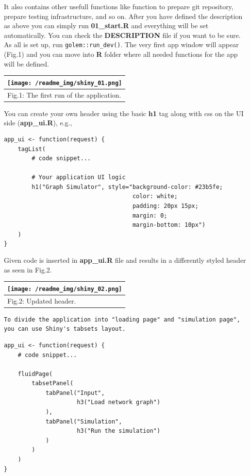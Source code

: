 \documentclass[
]{article}
\begin{document}
It also contains other usefull functions like function to prepare git
repository, prepare testing infrastructure, and so on. After you have
defined the description as above you can simply run \textbf{01\_start.R}
and everything will be set automatically. You can check the
\textbf{DESCRIPTION} file if you want to be sure. As all is set up, run
\texttt{golem::run\_dev()}. The very first app window will appear
(Fig.1) and you can move into \textbf{R} folder where all needed
functions for the app will be defined.

\begin{longtable}[]{@{}l@{}}
\toprule()
\texttt{[image: /readme\_img/shiny\_01.png]} \\
\midrule()
\endhead
Fig.1: The first run of the application. \\
\bottomrule()
\end{longtable}

You can create your own header using the basic \textbf{h1} tag along
with css on the UI side (\textbf{app\_ui.R}), e.g.,

\begin{verbatim}
app_ui <- function(request) {
    tagList(
        # code snippet...

        # Your application UI logic
        h1("Graph Simulator", style="background-color: #23b5fe;
                                     color: white;
                                     padding: 20px 15px;
                                     margin: 0;
                                     margin-bottom: 10px")
    )
}
\end{verbatim}

Given code is inserted in \textbf{app\_ui.R} file and results in a
differently styled header as seen in Fig.2.

\begin{longtable}[]{@{}l@{}}
\toprule()
\texttt{[image: /readme\_img/shiny\_02.png]} \\
\midrule()
\endhead
Fig.2: Updated header. \\
\bottomrule()
\end{longtable}

\begin{verbatim}
To divide the application into "loading page" and "simulation page", you can use Shiny's tabsets layout.
\end{verbatim}

\begin{verbatim}
app_ui <- function(request) {
    # code snippet...

    fluidPage(
        tabsetPanel(
            tabPanel("Input",
                     h3("Load network graph")
            ),
            tabPanel("Simulation",
                     h3("Run the simulation")
            )
        )
    )
}
\end{verbatim}
\end{document}
